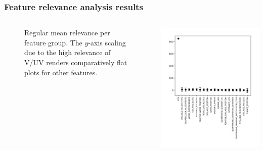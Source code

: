 \documentclass[a4paper,9pt]{beamer}
\theoremstyle{mytheoremstyle}
\begin{document}
\begin{frame}
\frametitle{Feature relevance analysis results}
\begin{columns}
\begin{figure}
	\caption{Regular mean relevance per feature group. The $y$-axis scaling due to the high relevance of V/UV renders comparatively flat plots for other features.}
\end{figure}
\begin{center}
  \includegraphics[width=\textwidth]{res/feature_relevance_ranking_-_mean_(sum)_-_general_feature_categories}
\end{center}
\end{columns}
\end{frame}
\end{document}
